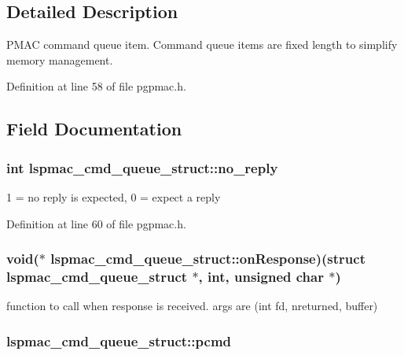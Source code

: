 \subsection{Detailed Description}
PMAC command queue item. Command queue items are fixed length to simplify memory management. 

Definition at line 58 of file pgpmac.h.

\subsection{Field Documentation}
\hypertarget{structlspmac__cmd__queue__struct_a33f70b45f8b7c27935cd3efe28748479}{
\subsubsection[{no\_\-reply}]{\setlength{\rightskip}{0pt plus 5cm}int {\bf lspmac\_\-cmd\_\-queue\_\-struct::no\_\-reply}}}
\label{structlspmac__cmd__queue__struct_a33f70b45f8b7c27935cd3efe28748479}


1 = no reply is expected, 0 = expect a reply 

Definition at line 60 of file pgpmac.h.\hypertarget{structlspmac__cmd__queue__struct_afe92c0bab9f124314a6f3d8104c94364}{
\subsubsection[{onResponse}]{\setlength{\rightskip}{0pt plus 5cm}void($\ast$ {\bf lspmac\_\-cmd\_\-queue\_\-struct::onResponse})(struct {\bf lspmac\_\-cmd\_\-queue\_\-struct} $\ast$, int, unsigned char $\ast$)}}
\label{structlspmac__cmd__queue__struct_afe92c0bab9f124314a6f3d8104c94364}


function to call when response is received. args are (int fd, nreturned, buffer) \hypertarget{structlspmac__cmd__queue__struct_a9ac7618bbe0faa3001e8efeb1d89010d}{
\subsubsection[{pcmd}]{ {\bf lspmac\_\-cmd\_\-queue\_\-struct::pcmd}}}
\label{structlspmac__cmd__queue__struct_a9ac7618bbe0faa3001e8efeb1d89010d}


